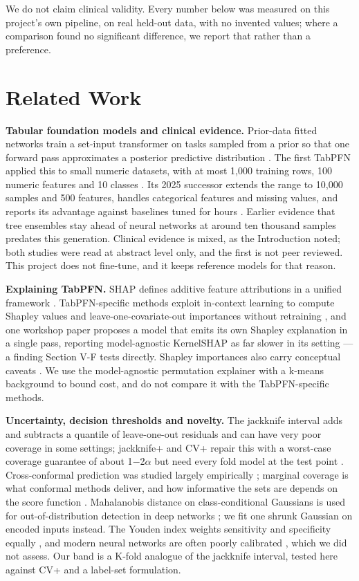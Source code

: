 \documentclass[conference]{IEEEtran}
\begin{document}
We do not claim clinical validity. Every number below was measured on this project's own pipeline, on real held-out data, with no invented values; where a comparison found no significant difference, we report that rather than a preference.

\section{Related Work}

\textbf{Tabular foundation models and clinical evidence.} Prior-data fitted networks train a set-input transformer on tasks sampled from a prior so that one forward pass approximates a posterior predictive distribution \cite{muller2022}. The first TabPFN applied this to small numeric datasets, with at most 1,000 training rows, 100 numeric features and 10 classes \cite{hollmann2023}. Its 2025 successor extends the range to 10,000 samples and 500 features, handles categorical features and missing values, and reports its advantage against baselines tuned for hours \cite{hollmann2025}. Earlier evidence that tree ensembles stay ahead of neural networks at around ten thousand samples \cite{grinsztajn2022} predates this generation. Clinical evidence is mixed, as the Introduction noted; both studies were read at abstract level only, and the first is not peer reviewed. This project does not fine-tune, and it keeps reference models for that reason.

\textbf{Explaining TabPFN.} SHAP defines additive feature attributions in a unified framework \cite{lundberg2017}. TabPFN-specific methods exploit in-context learning to compute Shapley values and leave-one-covariate-out importances without retraining \cite{rundel2024}, and one workshop paper proposes a model that emits its own Shapley explanation in a single pass, reporting model-agnostic KernelSHAP as far slower in its setting \cite{realtime2026} --- a finding Section V-F tests directly. Shapley importances also carry conceptual caveats \cite{kumar2020}. We use the model-agnostic permutation explainer with a k-means background to bound cost, and do not compare it with the TabPFN-specific methods.

\textbf{Uncertainty, decision thresholds and novelty.} The jackknife interval adds and subtracts a quantile of leave-one-out residuals and can have very poor coverage in some settings; jackknife+ and CV+ repair this with a worst-case coverage guarantee of about 1$-$2$\alpha$ but need every fold model at the test point \cite{barber2021}. Cross-conformal prediction was studied largely empirically \cite{vovk2015}; marginal coverage is what conformal methods deliver, and how informative the sets are depends on the score function \cite{angelopoulos2021}. Mahalanobis distance on class-conditional Gaussians is used for out-of-distribution detection in deep networks \cite{lee2018}; we fit one shrunk Gaussian \cite{ledoit2004} on encoded inputs instead. The Youden index weights sensitivity and specificity equally \cite{shan2015}, and modern neural networks are often poorly calibrated \cite{guo2017}, which we did not assess. Our band is a K-fold analogue of the jackknife interval, tested here against CV+ and a label-set formulation.
\end{document}
